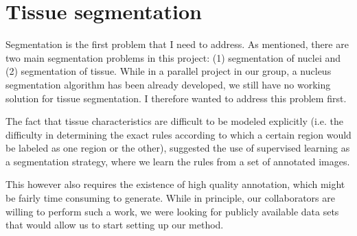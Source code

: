 \documentclass[a4paper,10pt]{article}
\begin{document}


\section{Tissue segmentation}
Segmentation is the first problem that I need to address. As
mentioned, there are two main segmentation problems in this project:
(1) segmentation of nuclei and (2) segmentation of tissue. While in a
parallel project in our group, a nucleus segmentation algorithm has
been already developed, we still have no working solution for tissue
segmentation. I therefore wanted to address this problem first. 

The fact that tissue characteristics are difficult to be modeled
explicitly (i.e. the difficulty in determining the exact rules
according to which a certain region would be labeled as one region or
the other), suggested the use of supervised learning as a segmentation
strategy, where we learn the rules from a set of annotated images. 

This however also requires the existence of high quality annotation,
which might be fairly time consuming to generate. While in principle,
our collaborators are willing to perform such a work, we were looking
for publicly available data sets that would allow us to start setting
up our method. 
\end{document}
